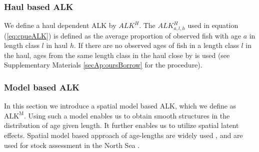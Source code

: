 \documentclass[a4paper 12pt]{article}
\numberwithin{equation}{section}
\begin{document}
\subsubsection{Haul based ALK}
\label{sec:haulestimator}
We define a haul dependent ALK  by  $ALK^{H}$. The $ALK^{H}_{a,l,h}$  used in equation (\ref{eq:cpueALK}) is defined as the average proportion of observed fish with age $a$ in  length class $l$ in haul $h$. If there are no observed ages of fish in a length class $l$ in the haul, ages from the same length class in the haul close by is used (see Supplementary Materials \ref{secAp:oursBorrow} for the procedure).

\subsubsection{Model based ALK}
\label{sec:spatialModelALK}
In this section we introduce a spatial model based ALK, which we define as $\mathrm{ALK^M}$. Using such a model enables us to obtain smooth structures in the distribution of age given length. It further enables us to utilize spatial latent effects. Spatial model based approach of age-lengths are widely used \citep{berg2012spatial, hirst2012bayesian, rindorf2001analyses}, and are used for stock assessment in the North Sea \citep{berg2014evaluation}.  %
\end{document}
